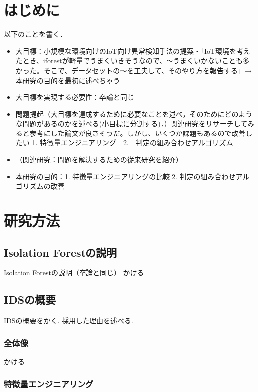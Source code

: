 \documentclass{css}
\begin{document}
\maketitle

\section{はじめに}
以下のことを書く．

\begin{itemize}
    \item 大目標：小規模な環境向けのIoT向け異常検知手法の提案・「IoT環境を考えたとき、iforestが軽量でうまくいきそうなので、〜うまくいかないことも多かった。そこで、データセットの〜を工夫して、そのやり方を報告する」→本研究の目的を最初に述べちゃう
    \item 大目標を実現する必要性：卒論と同じ
    \item 問題提起（大目標を達成するために必要なことを述べ，そのためにどのような問題があるのかを述べる(小目標に分割する)．）関連研究をリサーチしてみると参考にした論文が良さそうだ。しかし、いくつか課題もあるので改善したい
    1. 特徴量エンジニアリング　2.　判定の組み合わせアルゴリズム 
    \item （関連研究：問題を解決するための従来研究を紹介）
    \item 本研究の目的：1. 特徴量エンジニアリングの比較 2. 判定の組み合わせアルゴリズムの改善
\end{itemize}


\section{研究方法}

\subsection{Isolation Forestの説明}
Isolation Forestの説明（卒論と同じ）
かける

\subsection{IDSの概要}

IDSの概要をかく.
採用した理由を述べる.

\subsubsection{全体像}
かける

\subsubsection{特徴量エンジニアリング}
\end{document}
